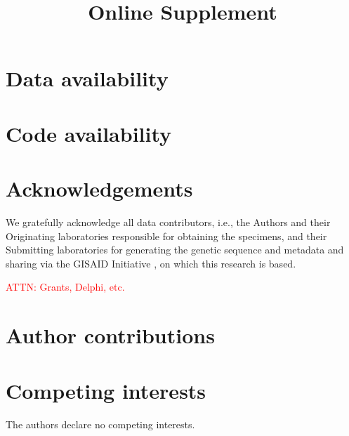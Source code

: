 \documentclass{article}
\newcommand{\beginsupplement}{
  \setcounter{table}{0}  
  \renewcommand{\thetable}{S\arabic{table}} 
  \setcounter{figure}{0} 
  \renewcommand{\thefigure}{S\arabic{figure}}
  \setcounter{section}{0} 
  \renewcommand{\thesection}{S\arabic{section}}
}
\newcommand{\attn }[1]{\textcolor{red}{ATTN: #1}}
\begin{document}









\section*{Data availability}
\section*{Code availability}

\clearpage





\section*{Acknowledgements}

We gratefully acknowledge all data contributors, i.e., the Authors and their
Originating laboratories responsible for obtaining the specimens, and their
Submitting laboratories for generating the genetic sequence and metadata and
sharing via the GISAID Initiative \citep{elbe2017data}, on which this research
is based.

\attn{Grants, Delphi, etc.}

\section*{Author contributions}

\section*{Competing interests}

The authors declare no competing interests.





\clearpage
\beginsupplement
\title{\supptitlefont Online Supplement}
\maketitle


\end{document}
